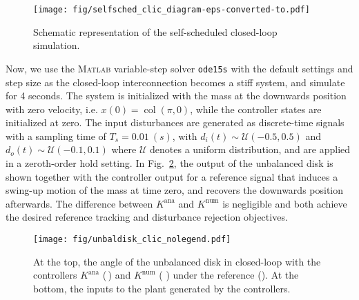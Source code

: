 \begin{figure}[b]
    \centering
    \texttt{[image: fig/selfsched\_clic\_diagram-eps-converted-to.pdf]}
    \caption{Schematic representation of the self-scheduled closed-loop simulation.}
    \label{fig:clic_genss}
\end{figure}
Now, we use the \textsc{Matlab} variable-step solver \lstinline{ode15s} with the default settings and step size as the closed-loop interconnection becomes a stiff system, and simulate for 4 seconds. The system is initialized with the mass at the downwards position with zero velocity, i.e. $x(0) = \operatorname{col}(\pi, 0)$, while the controller states are initialized at zero. The input disturbances are generated as discrete-time signals with a sampling time of $T_s = 0.01 \ (s)$, with $d_i(t) \sim  \mathcal{U}(-0.5, 0.5)$ and $d_o(t)\sim  \mathcal{U}(-0.1, 0.1)$ where $\mathcal{U}$ denotes a uniform distribution, and are applied in a zeroth-order hold setting. In Fig.~\ref{fig:clic_sim}, the output of the unbalanced disk is shown together with the controller output for a reference signal that induces a swing-up motion of the mass at time zero, and recovers the downwards position afterwards. The difference between $K^\mathrm{ana}$ and $K^\mathrm{num}$ is negligible and both achieve the desired reference tracking and disturbance rejection objectives.

    \begin{figure}[t]
        \centering
        \texttt{[image: fig/unbaldisk\_clic\_nolegend.pdf]}
        \caption{At the top, the angle of the unbalanced disk in closed-loop with the controllers $K^\mathrm{ana}$ (\,) and $K^\mathrm{num}$ (\,\,) under the reference (). At the bottom, the inputs to the plant generated by the controllers.}
        \label{fig:clic_sim}
    \end{figure}



